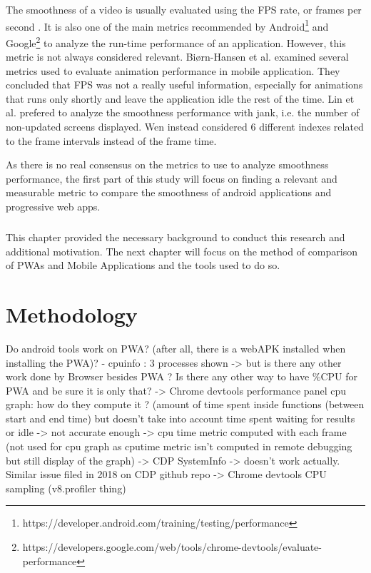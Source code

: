 \documentclass{kththesis}
\begin{document}
The smoothness of a video is usually evaluated using the FPS rate, or frames per second \cite{smooth_gui}. It is also one of the main metrics recommended by Android\footnote{https://developer.android.com/training/testing/performance} and Google\footnote{https://developers.google.com/web/tools/chrome-devtools/evaluate-performance} to analyze the run-time performance of an application.\newline
However, this metric is not always considered relevant. Biørn-Hansen et al. \cite{animation_performance} examined several metrics used to evaluate animation performance in mobile application. They concluded that FPS was not a really useful information, especially for animations that runs only shortly and leave the application idle the rest of the time. Lin et al. prefered to 
analyze the smoothness performance with jank, i.e. the number of non-updated screens displayed. Wen \cite{smoothnessQoE} instead considered 6 different indexes related to the frame intervals instead of the frame time. 

As there is no real consensus on the metrics to use to analyze smoothness performance,  the first part of this study will focus on finding a relevant and measurable metric to compare the smoothness of android applications and progressive web apps.




\paragraph{}
This chapter provided the necessary background to conduct this research and additional motivation. The next chapter will focus on the method of comparison of PWAs and Mobile Applications and the tools used to do so.
    

\chapter{Methodology}

\iffalse
Do android tools work on PWA? (after all, there is a webAPK installed when installing the PWA)?
    - cpuinfo : 3 processes shown -> but is there any other work done by Browser besides PWA ? Is there any other way to have \%CPU for PWA and be sure it is only that?
        -> Chrome devtools performance panel cpu graph: how do they compute it ? (amount of time spent inside functions (between start and end time) but doesn't take into account time spent waiting for results or idle -> not accurate enough
        -> cpu time metric computed with each frame (not used for cpu graph as cputime metric isn't computed in remote debugging but still display of the graph)
        -> CDP SystemInfo -> doesn't work actually. Similar issue filed in 2018 on CDP github repo
        -> Chrome devtools CPU sampling (v8.profiler thing)
        
\end{document}
